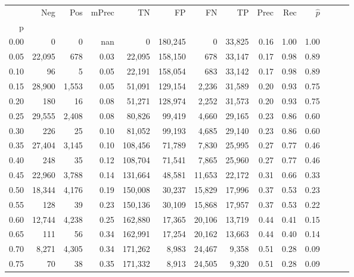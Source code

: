 \begin{tabular}{rrrrrrrrrrrrrr}
\toprule
{} &     Neg &    Pos & mPrec &       TN &       FP &      FN &      TP &  Prec &   Rec & $\hat{p}$ \\
p    &         &        &       &          &          &         &         &       &       &           \\
\midrule
0.00 &       0 &      0 &   nan &        0 &  180,245 &       0 &  33,825 &  0.16 &  1.00 &      1.00 \\
0.05 &  22,095 &    678 &  0.03 &   22,095 &  158,150 &     678 &  33,147 &  0.17 &  0.98 &      0.89 \\
0.10 &      96 &      5 &  0.05 &   22,191 &  158,054 &     683 &  33,142 &  0.17 &  0.98 &      0.89 \\
0.15 &  28,900 &  1,553 &  0.05 &   51,091 &  129,154 &   2,236 &  31,589 &  0.20 &  0.93 &      0.75 \\
0.20 &     180 &     16 &  0.08 &   51,271 &  128,974 &   2,252 &  31,573 &  0.20 &  0.93 &      0.75 \\
0.25 &  29,555 &  2,408 &  0.08 &   80,826 &   99,419 &   4,660 &  29,165 &  0.23 &  0.86 &      0.60 \\
0.30 &     226 &     25 &  0.10 &   81,052 &   99,193 &   4,685 &  29,140 &  0.23 &  0.86 &      0.60 \\
0.35 &  27,404 &  3,145 &  0.10 &  108,456 &   71,789 &   7,830 &  25,995 &  0.27 &  0.77 &      0.46 \\
0.40 &     248 &     35 &  0.12 &  108,704 &   71,541 &   7,865 &  25,960 &  0.27 &  0.77 &      0.46 \\
0.45 &  22,960 &  3,788 &  0.14 &  131,664 &   48,581 &  11,653 &  22,172 &  0.31 &  0.66 &      0.33 \\
0.50 &  18,344 &  4,176 &  0.19 &  150,008 &   30,237 &  15,829 &  17,996 &  0.37 &  0.53 &      0.23 \\
0.55 &     128 &     39 &  0.23 &  150,136 &   30,109 &  15,868 &  17,957 &  0.37 &  0.53 &      0.22 \\
0.60 &  12,744 &  4,238 &  0.25 &  162,880 &   17,365 &  20,106 &  13,719 &  0.44 &  0.41 &      0.15 \\
0.65 &     111 &     56 &  0.34 &  162,991 &   17,254 &  20,162 &  13,663 &  0.44 &  0.40 &      0.14 \\
0.70 &   8,271 &  4,305 &  0.34 &  171,262 &    8,983 &  24,467 &   9,358 &  0.51 &  0.28 &      0.09 \\
0.75 &      70 &     38 &  0.35 &  171,332 &    8,913 &  24,505 &   9,320 &  0.51 &  0.28 &      0.09 \\

\end{tabular}
